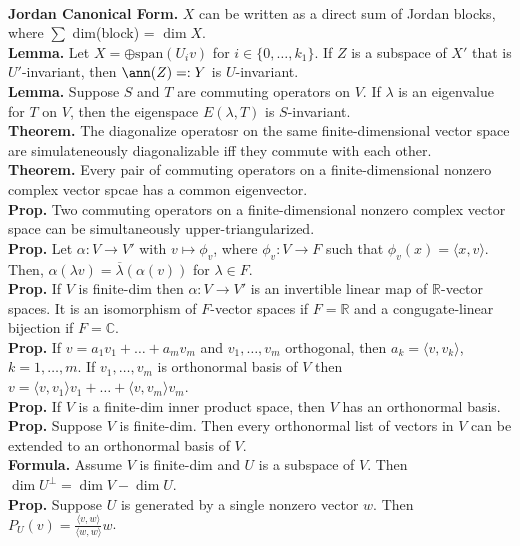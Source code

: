 	\\ \textbf{Jordan Canonical Form. } $X$ can be written as a direct sum of Jordan blocks, where $\sum$ dim(block) = $\dim X$. 
	\\ \textbf{Lemma. } Let $X = \oplus \textrm{span}(U_iv)$ for $i \in \{0,\dots,k_1\}$. If $Z$ is a subspace of $X'$ that is $U'$-invariant, then $\ann(Z) =: Y$ is $U$-invariant. 
	\\ \textbf{Lemma. } Suppose $S$ and $T$ are commuting operators on $V$. If $\lambda$ is an eigenvalue for $T$ on $V$, then the eigenspace $E(\lambda, T)$ is $S$-invariant. 
	\\ \textbf{Theorem. } The diagonalize operatosr on the same finite-dimensional vector space are simulateneously diagonalizable iff they commute with each other. 
	\\ \textbf{Theorem. } Every pair of commuting operators on a finite-dimensional nonzero complex vector spcae has a common eigenvector. 
	\\ \textbf{Prop. } Two commuting operators on a finite-dimensional nonzero complex vector space can be simultaneously upper-triangularized. 
	\\ \textbf{Prop. } Let $\alpha: V \to V'$ with $v \mapsto \phi_v$, where $\phi_v: V \to F$ such that $\phi_v(x) = \langle x,v \rangle$. Then, $\alpha(\lambda v) = \overline{\lambda}(\alpha(v))$ for $\lambda \in F$. 
	\\ \textbf{Prop. } If $V$ is finite-dim then $\alpha: V \to V'$ is an invertible linear map of $\mathbb{R}$-vector spaces. It is an isomorphism of $F$-vector spaces if $F=\mathbb{R}$ and a congugate-linear bijection if $F = \mathbb{C}$. 
	\\ \textbf{Prop. } If $v=a_1v_1 + \dots + a_mv_m$ and $v_1,\dots,v_m$ orthogonal, then $a_k = \langle v,v_k \rangle$, $k=1,\dots,m$. If $v_1,\dots,v_m$ is orthonormal basis of $V$ then $v=\langle v,v_1 \rangle v_1 + \dots + \langle v,v_m \rangle v_m$. 
	\\ \textbf{Prop. } If $V$ is a finite-dim inner product space, then $V$ has an orthonormal basis. 
	\\ \textbf{Prop. } Suppose $V$ is finite-dim. Then every orthonormal list of vectors in $V$ can be extended to an orthonormal basis of $V$. 
	\\ \textbf{Formula. } Assume $V$ is finite-dim and $U$ is a subspace of $V$. Then $\dim U^\perp = \dim V - \dim U$. 
	\\ \textbf{Prop. } Suppose $U$ is generated by a single nonzero vector $w$. Then $P_U(v) = \frac{\langle v,w \rangle}{\langle w,w \rangle}w$. 

